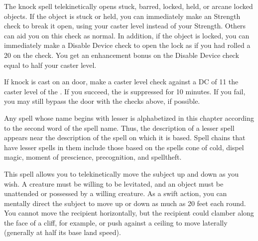 \begin{comment}
\subsubsection{J-L}
\end{comment}

\spellrng{\rngclose}
\begin{spelleffect}
  The knock spell telekinetically opens stuck, barred, locked, held, or arcane locked objects. If the object is stuck or held, you can immediately make an Strength check to break it open, using your caster level instead of your Strength. Others can aid you on this check as normal. In addition, if the object is locked, you can immediately make a Disable Device check to open the lock as if you had rolled a 20 on the check. You get an enhancement bonus on the Disable Device check equal to half your caster level.
\end{spelleffect}
\begin{spellnotes}
  If knock is cast on an  door, make a caster level check against a DC of 11 \add the caster level of the . If you succeed, the  is suppressed for 10 minutes. If you fail, you may still bypass the door with the checks above, if possible.
\end{spellnotes}

\par Any spell whose name begins with lesser is alphabetized in this chapter according to the second word of the spell name. Thus, the description of a lesser spell appears near the description of the spell on which it is based. Spell chains that have lesser spells in them include those based on the spells cone of cold, dispel magic, moment of prescience, precognition, and spelltheft.

\spellrng{\rngclose}
\begin{spelleffect}
  This spell allows you to telekinetically move the subject up and down as you wish. A creature must be willing to be levitated, and an object must be unattended or possessed by a willing creature. As a swift action, you can mentally direct the subject to move up or down as much as 20 feet each round. You cannot move the recipient horizontally, but the recipient could clamber along the face of a cliff, for example, or push against a ceiling to move laterally (generally at half its base land speed).
\end{spelleffect}

